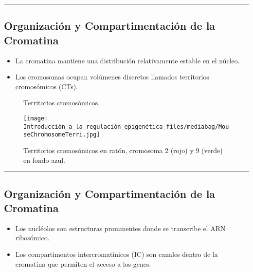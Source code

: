 \documentclass[
  letterpaper,
  DIV=11,
  numbers=noendperiod]{scrartcl}
\providecommand{\tightlist}{%
  \setlength{\itemsep}{0pt}\setlength{\parskip}{0pt}}\usepackage{longtable,booktabs,array}
\begin{document}
\begin{center}\rule{0.5\linewidth}{0.5pt}\end{center}

\subsection{Organización y Compartimentación de la
Cromatina}\label{organizaciuxf3n-y-compartimentaciuxf3n-de-la-cromatina}

\begin{itemize}
\tightlist
\item
  La cromatina mantiene una distribución relativamente estable en el
  núcleo.
\item
  Los cromosomas ocupan volúmenes discretos llamados territorios
  cromosómicos (CTs).
\end{itemize}

\begin{figure}[H]

{\centering 

}

\caption{Territorios cromosómicos.}

\end{figure}%

\begin{figure}[H]

{\centering \texttt{[image: Introducción\_a\_la\_regulación\_epigenética\_files/mediabag/MouseChromosomeTerri.jpg]}

}

\caption{Territorios cromosómicos en ratón, cromosoma 2 (rojo) y 9
(verde) en fondo azul.}

\end{figure}%

\begin{center}\rule{0.5\linewidth}{0.5pt}\end{center}

\subsection{Organización y Compartimentación de la
Cromatina}\label{organizaciuxf3n-y-compartimentaciuxf3n-de-la-cromatina-1}

\begin{itemize}
\tightlist
\item
  Los nucléolos son estructuras prominentes donde se transcribe el ARN
  ribosómico.
\item
  Los compartimentos intercromatínicos (IC) son canales dentro de la
  cromatina que permiten el acceso a los genes.
\end{itemize}
\end{document}
